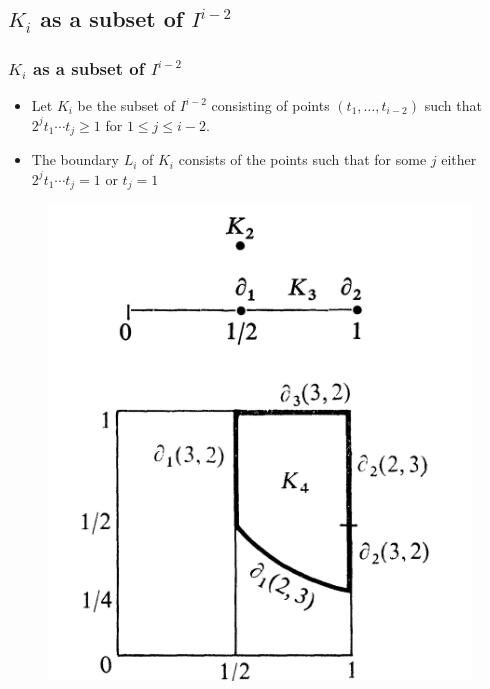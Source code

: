 \documentclass{beamer}
\theoremstyle{definition}
\begin{document}
\subsection{$K_i$ as a subset of $I^{i-2}$}
\begin{frame}
\frametitle{$K_i$ as a subset of $I^{i-2}$}
\begin{itemize}
\item<1-> Let $K_i$ be the subset of $I^{i-2}$ consisting of points $(t_1,\dots, t_{i-2})$ such that $2^jt_1\cdots t_j\geq 1$ for $1\leq j\leq i-2$.
\item<2-> The boundary $L_i$ of $K_i$ consists of the points such that for some $j$ either $2^jt_1\cdots t_j= 1$ or $t_j=1$ %
\end{itemize}
\end{frame}
\begin{frame}
\begin{figure}
\includegraphics[scale=0.25]{k234}
\end{figure}
\end{frame}
\end{document}
